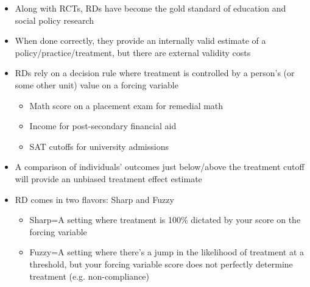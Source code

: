 \documentclass{beamer}
\begin{document}
\begin{frame}[<+->]
	\begin{itemize}
		\item Along with RCTs, RDs have become the gold standard of education and social policy research
		\item When done correctly, they provide an internally valid estimate of a policy/practice/treatment, but there are external validity costs
		\item RDs rely on a decision rule where treatment is controlled by a person's (or some other unit) value on a forcing variable \medskip
		\begin{itemize}
			\item Math score on a placement exam for remedial math
			\item Income for post-secondary financial aid
			\item SAT cutoffs for university admissions
		\end{itemize}
			\item A comparison of individuals' outcomes just below/above the treatment cutoff will provide an unbiased treatment effect estimate
			\item RD comes in two flavors: Sharp and Fuzzy
			\begin{itemize}
				\item Sharp=A setting where treatment is 100\% dictated by your score on the forcing variable
				\item Fuzzy=A setting where there's a jump in the likelihood of treatment at a threshold, but your forcing variable score does not perfectly determine treatment (e.g. non-compliance)
			\end{itemize}
		\end{itemize}

\end{frame}
\end{document}
